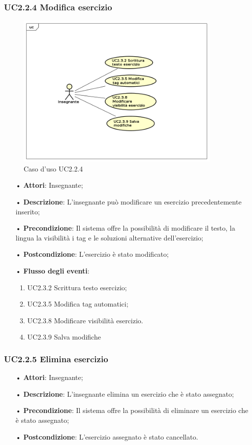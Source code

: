 \subsubsection{UC2.2.4 Modifica esercizio}

\begin{figure}[H]
\centering
\includegraphics[width=10cm]{img/UC224.png} 
\caption{Caso d'uso UC2.2.4}
\end{figure}

\begin{itemize}
	\item[•] \textbf{Attori}: Insegnante;
	\item[•] \textbf{Descrizione}: L’insegnante può modificare un esercizio precedentemente inserito;
	\item[•] \textbf{Precondizione}: Il sistema offre la possibilità di modificare il testo, la
				lingua la visibilità i tag e le soluzioni alternative 
				dell’esercizio;
	\item[•] \textbf{Postcondizione}: L’esercizio è stato modificato;
	\item[•] \textbf{Flusso degli eventi}:
		\begin{enumerate}
			\item UC2.3.2 Scrittura testo esercizio;
			\item UC2.3.5 Modifica tag automatici;
			\item UC2.3.8 Modificare visibilità esercizio.
			\item UC2.3.9 Salva modifiche
		\end{enumerate}
		    
\end{itemize}   	
	
\subsubsection{UC2.2.5 Elimina esercizio}
\begin{itemize}
	\item[•] \textbf{Attori}: Insegnante;
	\item[•] \textbf{Descrizione}: L’insegnante elimina un esercizio che è stato assegnato;
	\item[•] \textbf{Precondizione}: Il sistema offre la possibilità di eliminare un esercizio che è stato assegnato;
	\item[•] \textbf{Postcondizione}: L’esercizio assegnato è stato cancellato.
\end{itemize}

